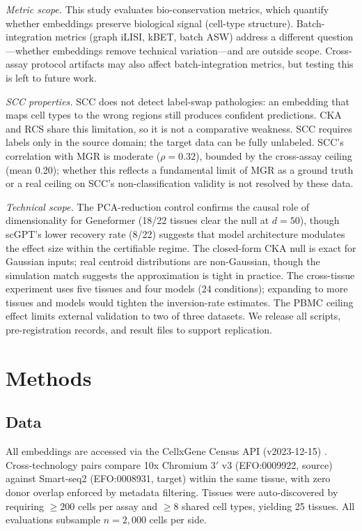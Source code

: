 \documentclass[11pt]{article}
\begin{document}
\emph{Metric scope.} This study evaluates bio-conservation metrics,
which quantify whether embeddings preserve biological signal (cell-type
structure). Batch-integration metrics (graph iLISI, kBET, batch ASW)
address a different question---whether embeddings remove technical
variation---and are outside scope. Cross-assay protocol artifacts may
also affect batch-integration metrics, but testing this is left to
future work.

\emph{SCC properties.} SCC does not detect label-swap pathologies: an
embedding that maps cell types to the wrong regions still produces
confident predictions. CKA and RCS share this limitation, so it is not
a comparative weakness. SCC requires labels only in the source domain;
the target data can be fully unlabeled. SCC's correlation with MGR is
moderate ($\rho = 0.32$), bounded by the cross-assay ceiling (mean
0.20); whether this reflects a fundamental limit of MGR as a ground
truth or a real ceiling on SCC's non-classification validity is not
resolved by these data.

\emph{Technical scope.} The PCA-reduction control confirms the causal
role of dimensionality for Geneformer (18/22 tissues clear the null at
$d = 50$), though scGPT's lower recovery rate (8/22) suggests that
model architecture modulates the effect size within the certifiable
regime. The closed-form CKA null is exact for Gaussian inputs; real
centroid distributions are non-Gaussian, though the simulation match
suggests the approximation is tight in practice. The cross-tissue
experiment uses five tissues and four models (24 conditions); expanding
to more tissues and models would tighten the inversion-rate estimates.
The PBMC ceiling effect limits external validation to two of three
datasets. We release all scripts, pre-registration records, and result
files to support replication.


\section{Methods}

\subsection{Data}

All embeddings are accessed via the CellxGene Census API (v2023-12-15)
\citep{abdulla2025cellxgene}. Cross-technology pairs compare 10x
Chromium 3$'$ v3 (EFO:0009922, source) against Smart-seq2
(EFO:0008931, target) within the same tissue, with zero donor overlap
enforced by metadata filtering. Tissues were auto-discovered by
requiring $\geq 200$ cells per assay and $\geq 8$ shared cell types,
yielding 25 tissues. All evaluations subsample $n = 2{,}000$ cells per
side.
\end{document}
